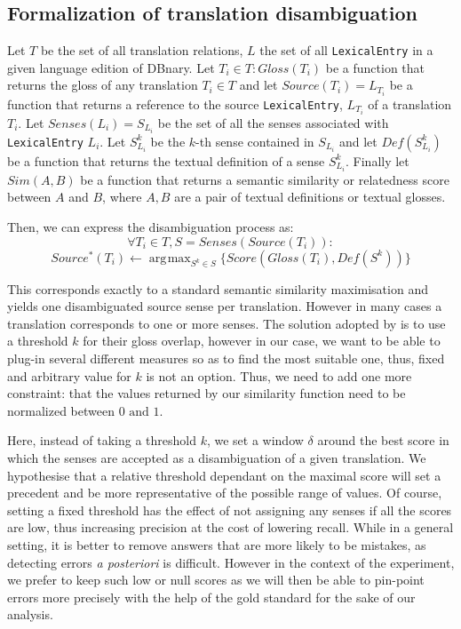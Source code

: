 \documentclass[10pt, a4paper]{article}
\DeclareMathOperator*{\argmax}{arg\!\max}
\begin{document}
\subsection{Formalization of translation disambiguation}
Let \(T\) be the set of all translation relations, \(L\) the set of all \verb|LexicalEntry| in a given language edition of DBnary. Let \(T_i\in T: Gloss(T_i)\) be a function that returns the gloss of any translation \(T_i\in T\) and let \(Source(T_i)=L_{T_i}\) be a function that returns a reference to the source \verb|LexicalEntry|, \(L_{T_i}\) of a translation \(T_i\). Let \(Senses(L_i)=S_{L_i}\) be the set of all the senses associated with \verb|LexicalEntry| \(L_i\). Let \(S_{L_i}^k\) be the \(k\)-th sense contained in \(S_{L_i}\) and let \(Def(S_{L_i}^k)\) be a function that returns the textual definition of a sense \(S_{L_i}^k\). Finally let \(Sim(A,B)\) be a function that returns a semantic similarity or relatedness score between \(A\) and \(B\), where \(A,B\) are a pair of textual definitions or textual glosses. 

Then, we can express the disambiguation process as:
\[
\forall T_i \in T, S=Senses(Source(T_i)): 
\]
\[
Source^*(T_i) \leftarrow  \argmax_{S^k\in S} \{Score(Gloss(T_i),Def(S^k))\}
\]

This corresponds exactly to a standard semantic similarity maximisation and yields one disambiguated source sense per translation. However in many cases a translation corresponds to one or more senses. The solution adopted by \cite{MeyerGurevych:oup2012} is to use a threshold \(k\) for their gloss overlap, however in our case, we want to be able to plug-in several different measures so as to find the most suitable one, thus, fixed and arbitrary value for \(k\) is not an option. Thus, we need to add one more constraint: that the values returned by our similarity function need to be normalized between \(0 \mbox{ and  } 1\).

Here, instead of taking a threshold \(k\), we set a window \(\delta\) around the best score in which the senses are accepted as a disambiguation of a given translation. We hypothesise that a relative threshold dependant on the maximal score will set a precedent and be more representative of the possible range of values. Of course, setting a fixed threshold has the effect of not assigning any senses if all the scores are low, thus increasing precision at the cost of lowering recall. While in a general setting, it is better to remove answers that are more likely to be mistakes, as detecting errors \emph{a posteriori} is difficult. However in the context of the experiment, we prefer to keep such low or null scores as we will then be able to pin-point errors more precisely with the help of the gold standard for the sake of our analysis.
\end{document}
